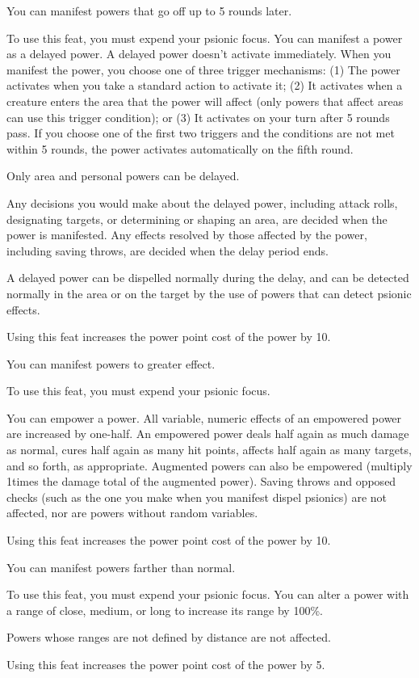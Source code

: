 {You can manifest powers that go off up to 5 rounds later.}
{}
{To use this feat, you must expend your psionic focus. You can manifest a power as a delayed power. A delayed power doesn't activate immediately. When you manifest the power, you choose one of three trigger mechanisms: (1) The power activates when you take a standard action to activate it; (2) It activates when a creature enters the area that the power will affect (only powers that affect areas can use this trigger condition); or (3) It activates on your turn after 5 rounds pass. If you choose one of the first two triggers and the conditions are not met within 5 rounds, the power activates automatically on the fifth round.

Only area and personal powers can be delayed.

Any decisions you would make about the delayed power, including attack rolls, designating targets, or determining or shaping an area, are decided when the power is manifested. Any effects resolved by those affected by the power, including saving throws, are decided when the delay period ends.

A delayed power can be dispelled normally during the delay, and can be detected normally in the area or on the target by the use of powers that can detect psionic effects.

Using this feat increases the power point cost of the power by 10.}{}{}

{You can manifest powers to greater effect.}
{}
{To use this feat, you must expend your psionic focus.

You can empower a power. All variable, numeric effects of an empowered power are increased by one-half. An empowered power deals half again as much damage as normal, cures half again as many hit points, affects half again as many targets, and so forth, as appropriate. Augmented powers can also be empowered (multiply 1\onehalf times the damage total of the augmented power). Saving throws and opposed checks (such as the one you make when you manifest dispel psionics) are not affected, nor are powers without random variables.

Using this feat increases the power point cost of the power by 10.}{}{}

{You can manifest powers farther than normal.}
{}
{To use this feat, you must expend your psionic focus. You can alter a power with a range of close, medium, or long to increase its range by 100\%. %

Powers whose ranges are not defined by distance are not affected.

Using this feat increases the power point cost of the power by 5.
}{}{}

